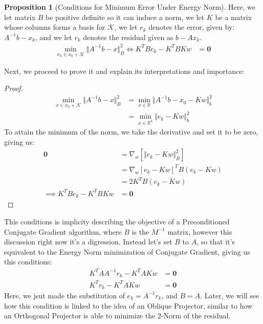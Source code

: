 \documentclass[]{article}
\theoremstyle{definition}
\newtheorem{prop}{Proposition}
\begin{document}
            \begin{prop}[Conditions for Minimum Error Under Energy Norm]
                Here, we let matrix $B$ be positive definite so it can induce a norm, we let $K$ be a matrix whose columns forms a basis for $\mathcal K$, we let $e_k$ denotes the error, given by: $A^{-1}b - x_k$, and we let $r_k$ denotes the residual given as $b - Ax_k$. 
                \begin{align}
                    \min_{x_k\in x_0 + \mathcal K}\Vert A^{-1}b - x\Vert_B^2
                    \iff
                    K^TBe_k - K^TBKw &= \mathbf 0
                \end{align} 
            \end{prop}
            Next, we proceed to prove it and explain its interpretations and importance: 
            \begin{proof}
                \begin{align}
                    \min_{x \in x_0 + \mathcal K}
                    \Vert A^{-1}b - x\Vert_B^2
                    &= 
                    \min_{x\in \mathbb R} 
                    \Vert A^{-1}b - x_0 - Kw\Vert_b^2
                    \\
                    &= \min_{x\in \mathbb R^k}
                    \Vert e_k - Kw\Vert_b^2
                \end{align}
                To attain the minimum of the norm, we take the derivative and set it to be zero, giving us: 
                \begin{align}
                    \mathbf 0 &= \nabla_w[\Vert e_k - Kw\Vert_B^2]
                    \\
                    &= \nabla_w[e_k - Kw]^TB(e_k - Kw)
                    \\
                    &= 2K^TB(e_k - Kw)
                    \\
                    \implies 
                    K^TBe_k - K^TBKw &= \mathbf 0
                \end{align}
            \end{proof}
            This conditions is implicity describing the objective of a Preconditioned Conjugate Gradient algorithm, where $B$ is the $M^{-1}$ matrix, however this discussion right now it's a digression. Instead let's set $B$ to $A$, so that it's equivalent to the Energy Norm minimization of Conjugate Gradient, giving us this conditions: 
            \begin{align}
                K^TAA^{-1}r_k - K^TAKw &= \mathbf 0
                \\
                K^Tr_k - K^TAKw &= \mathbf 0
            \end{align}
            Here, we jsut made the substitution of $e_k = A^{-1}r_k$, and $B = A$. Later, we will see how this condition is linked to the idea of an Oblique Projector, similar to how an Orthogonal Projector is able to minimize the 2-Norm of the residual. 
\end{document}
